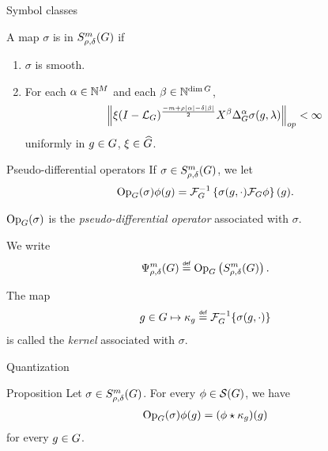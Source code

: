 \documentclass{beamer}
\begin{document}
\begin{frame}{Symbol classes}
    \begin{definition}
        A map $\sigma$ is in $S^{m}_{\rho, \delta}(G)$ if
        \begin{enumerate}
            \item
                $\sigma$ is smooth.
            \item
                For each $\alpha \in \mathbb{N}^M$ and each $\beta \in \mathbb{N}^{\dim G}$,
                \begin{align*}
                    \norm [op] {
                        \xi \BesselPotential {-m + \rho \abs \alpha - \delta \abs \beta}
                        \LeftDifferentialOperator \beta \DifferenceOperatorOrder \alpha \sigma(g, \lambda)
                    } < \infty
                \end{align*}
                uniformly in $g \in G$, $\xi \in {\widehat{G}}$.
        \end{enumerate}
    \end{definition}
\end{frame}

\begin{frame}{Pseudo-differential operators}
    If $\sigma \in S^{m}_{\rho, \delta}(G)$,
    we let
    \begin{align*}
        \mathrm{Op}_{G}(\sigma) \phi(g) = \mathcal{F}^{-1}_{G} \left\{ \sigma(g, \cdot) \mathcal{F}_{G} \phi \right\}(g).
    \end{align*}

    $\mathrm{Op}_{G}(\sigma)$ is the \emph{pseudo-differential operator} associated with $\sigma$.

    We write
    \begin{align*}
        \OperatorClass m {\rho, \delta} \defeq \Op \left(\SymbolClass m {\rho, \delta}\right).
    \end{align*}

    \pause

    The map
    \begin{align*}
        g \in \Group \mapsto \kappa_g \defeq \InverseFourier \{\sigma(g, \dummy)\}
    \end{align*}
    is called the \emph{kernel} associated with $\sigma$.
\end{frame}

\begin{frame}{Quantization}
    \begin{block}{Proposition}
        Let $\sigma \in S^{m}_{\rho, \delta}(G)$.
        For every $\phi \in {\mathcal{S} (G)}$,
        we have
        \begin{align*}
            \mathrm{Op}_{G}(\sigma) \phi(g) = (\phi \star \kappa_g)(g)
        \end{align*}
        for every $g \in G$.
    \end{block}
\end{frame}
\end{document}

